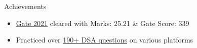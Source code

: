\documentclass{resume} %
\begin{document}
\vspace{-10pt}
\begin{rSection}{Achievements}
\begin{itemize}
\setlength{\itemsep}{-6pt}
    \item \href{https://drive.google.com/file/d/1ARz_BLLcELOdsD-tSp_IxuJ8UMXhP7_6/view?usp=share_link}{Gate 2021} cleared with Marks: 25.21 \& Gate Score: 339
    \item Practiced over \href{https://codolio.com/profile/ashuguptahere}{190+ DSA questions} on various platforms
\end{itemize}

\end{rSection}


\end{document}
